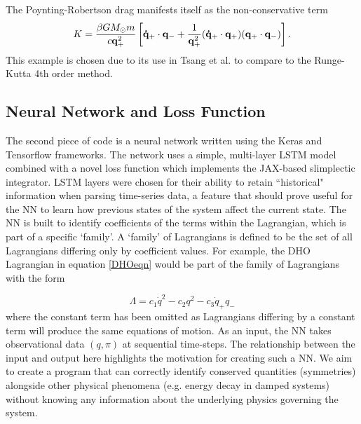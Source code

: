 \documentclass[10pt]{iopart}
\begin{document}
The Poynting-Robertson drag manifests itself as the non-conservative term
\begin{equation}
	K = \frac{\beta GM_\odot m}{c\bold{q}_+^2}\left[\bold{\dot{q}}_+\cdot \bold{q}_- + \frac{1}{\bold{q}_+^2}(\bold{\dot{q}}_+\cdot\bold{q}_+)(\bold{q}_+\cdot\bold{q}_-)\right].
\end{equation}
This example is chosen due to its use in Tsang et al. \cite{Tsang_Slimplectic} to compare to the Runge-Kutta 4th order method.

\subsection{Neural Network and Loss Function}
The second piece of code is a neural network written using the Keras \cite{Keras} and Tensorflow \cite{TF} frameworks. The network uses a simple, multi-layer LSTM model \cite{LSTM} combined with a novel loss function which implements the JAX-based slimplectic integrator. LSTM layers were chosen for their ability to retain ``historical" information when parsing time-series data, a feature that should prove useful for the NN to learn how previous states of the system affect the current state.
The NN is built to identify coefficients of the terms within the Lagrangian, which is part of a specific `family'. A `family' of Lagrangians is defined to be the set of all Lagrangians differing only by coefficient values. For example, the DHO Lagrangian in equation \ref{DHOeqn} would be part of the family of Lagrangians with the form 

\begin{equation}
	\label{DHOFamily}
	\Lambda = c_1\dot{q}^2 - c_2q^2 - c_3\dot{q}_+q_-
\end{equation}
where the constant term has been omitted as Lagrangians differing by a constant term will produce the same equations of motion. As an input, the NN takes observational data $(q,\pi)$ at sequential time-steps. The relationship between the input and output here highlights the motivation for creating such a NN. We aim to create a program that can correctly identify conserved quantities (symmetries) alongside other physical phenomena (e.g. energy decay in damped systems) without knowing any information about the underlying physics governing the system. 
\end{document}
